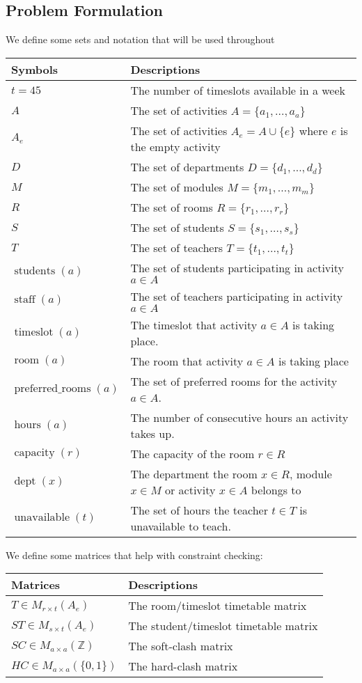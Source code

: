 \documentclass[12pt]{article}
\theoremstyle{definition}
\theoremstyle{plain}
\DeclareMathOperator{\students}{students}
\DeclareMathOperator{\staff}{staff}
\DeclareMathOperator{\ts}{timeslot}
\DeclareMathOperator{\room}{room}
\DeclareMathOperator{\prooms}{preferred\_rooms}
\DeclareMathOperator{\hours}{hours}
\DeclareMathOperator{\capacity}{capacity}
\DeclareMathOperator{\dept}{dept}
\DeclareMathOperator{\unv}{unavailable}
\begin{document}
\subsection{Problem Formulation}
We define some sets and notation that will be used throughout
\begin{center}
	\begin{tabular}{ |l|l| }
		\hline
		Symbols & Descriptions \\ 
		\hline
		$t = 45$ & The number of timeslots available in a week\\
		$A$ & The set of activities $A = \{a_1, \dots, a_a\}$\\
		$A_e$ & The set of activities $A_e = A \cup \{e\}$ where $e$ is the empty activity\\
		$D$ & The set of departments $D = \{d_1, \dots, d_d\}$\\
		$M$ & The set of modules $M = \{m_1, \dots, m_m\}$\\
		$R$ & The set of rooms $R = \{r_1, \dots, r_r\}$ \\
		$S$ & The set of students $S = \{s_1, \dots, s_s\}$\\
		$T$ & The set of teachers $T = \{t_1, \dots, t_t\}$\\ 
		$\students(a)$ & The set of students participating in activity $a \in A$\\
		$\staff(a)$ & The set of teachers participating in activity $a \in A$ \\
		$\ts(a)$ & The timeslot that activity $a \in A$ is taking place.\\
		$\room(a)$ & The room that activity $a \in A$ is taking place \\
		$\prooms(a)$ & The set of preferred rooms for the activity $a \in A$.\\
		$\hours(a)$ & The number of consecutive hours an activity takes up.\\
		$\capacity(r)$ & The capacity of the room $r \in R$\\
		$\dept(x)$ & The department the room $x \in R$, module $x \in M$ or activity $x \in A$ belongs to\\
		$\unv(t)$ & The set of hours the teacher $t \in T$ is unavailable to teach.\\
		
		\hline
	\end{tabular}
\end{center}

We define some matrices that help with constraint checking:
\begin{center}
	\begin{tabular}{ |l|l| } 
		\hline
		Matrices & Descriptions \\
		\hline
		$T \in M_{r\times t }(A_e)$ & The room/timeslot timetable matrix\\
		$ST \in M_{s \times t}(A_e)$ & The student/timeslot timetable matrix\\
		$SC \in M_{a \times a}(\mathbb{Z})$ & The soft-clash matrix\\
		$HC \in M_{a \times a}(\{0, 1\})$ & The hard-clash matrix\\
		
		\hline
	\end{tabular}
\end{center}
\end{document}
